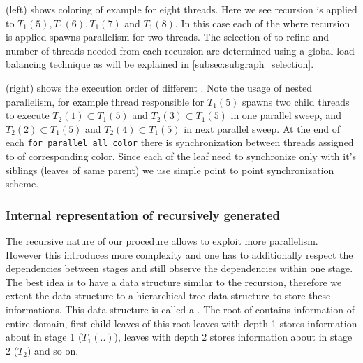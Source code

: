       (left) shows \DTWO coloring of \stex example for eight threads. Here we see recursion is applied to \levelGroups $T_1(5),T_1(6),T_1(7)$ and $T_1(8)$. In this case each of the \levelGroups where recursion is applied spawns parallelism for two threads. The selection of \levelGroups to refine and number of threads needed from each recursion are determined using a global load balancing technique as will be explained in \cref{subsec:subgraph_selection}.
     
       (right) shows the execution order of different \levelGroups. Note the usage of nested parallelism, \ie for example thread responsible for $T_1(5)$ spawns two child threads to execute $T_2(1) \subset T_1(5)$ and $T_2(3) \subset T_1(5)$ in one parallel sweep, and $T_2(2) \subset T_1(5)$ and $T_2(4) \subset T_1(5)$ in next parallel sweep. At the end of each {\tt for parallel all color} there is synchronization between threads assigned to \levelGroup of corresponding color. Since each of the leaf need to synchronize only with it's siblings (leaves of same parent)  we use simple point to point synchronization scheme. 
          
       
	\subsubsection{Internal representation of recursively generated \boldmath{\levelGroups}} \label{subsec:level_tree}
	The recursive nature of our procedure allows to exploit more parallelism. However this introduces more complexity and one has to additionally respect the dependencies between stages and still observe the dependencies within one stage. The best idea is to have a data structure similar to the recursion, therefore we extent the \levelPtr data structure to a hierarchical tree data structure to store these informations. This data structure is called a \levelTree. The root of \levelTree contains information of entire domain, first child leaves of this root \ie leaves with depth 1 stores information about \levelGroups in stage 1 ($T_1(..)$), leaves with depth 2 stores information about \levelGroups in stage 2 ($T_2$) and so on. 
	
